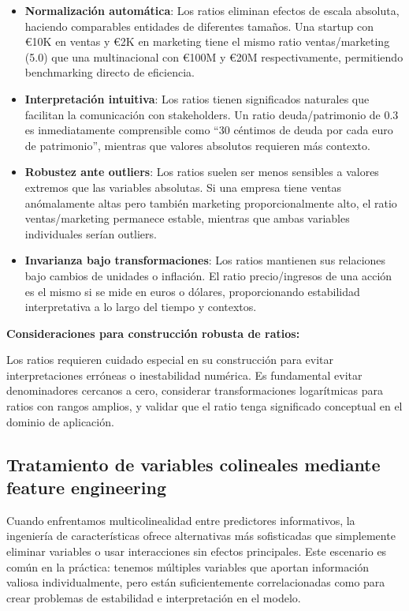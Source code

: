 \documentclass[
  letterpaper,
  DIV=11,
  numbers=noendperiod]{scrreprt}
\begin{document}
\begin{itemize}
\item
  \textbf{Normalización automática}: Los ratios eliminan efectos de
  escala absoluta, haciendo comparables entidades de diferentes tamaños.
  Una startup con €10K en ventas y €2K en marketing tiene el mismo ratio
  ventas/marketing (5.0) que una multinacional con €100M y €20M
  respectivamente, permitiendo benchmarking directo de eficiencia.
\item
  \textbf{Interpretación intuitiva}: Los ratios tienen significados
  naturales que facilitan la comunicación con stakeholders. Un ratio
  deuda/patrimonio de 0.3 es inmediatamente comprensible como ``30
  céntimos de deuda por cada euro de patrimonio'', mientras que valores
  absolutos requieren más contexto.
\item
  \textbf{Robustez ante outliers}: Los ratios suelen ser menos sensibles
  a valores extremos que las variables absolutas. Si una empresa tiene
  ventas anómalamente altas pero también marketing proporcionalmente
  alto, el ratio ventas/marketing permanece estable, mientras que ambas
  variables individuales serían outliers.
\item
  \textbf{Invarianza bajo transformaciones}: Los ratios mantienen sus
  relaciones bajo cambios de unidades o inflación. El ratio
  precio/ingresos de una acción es el mismo si se mide en euros o
  dólares, proporcionando estabilidad interpretativa a lo largo del
  tiempo y contextos.
\end{itemize}

\textbf{Consideraciones para construcción robusta de ratios:}

Los ratios requieren cuidado especial en su construcción para evitar
interpretaciones erróneas o inestabilidad numérica. Es fundamental
evitar denominadores cercanos a cero, considerar transformaciones
logarítmicas para ratios con rangos amplios, y validar que el ratio
tenga significado conceptual en el dominio de aplicación.

\subsection{Tratamiento de variables colineales mediante feature
engineering}\label{tratamiento-de-variables-colineales-mediante-feature-engineering}

Cuando enfrentamos multicolinealidad entre predictores informativos, la
ingeniería de características ofrece alternativas más sofisticadas que
simplemente eliminar variables o usar interacciones sin efectos
principales. Este escenario es común en la práctica: tenemos múltiples
variables que aportan información valiosa individualmente, pero están
suficientemente correlacionadas como para crear problemas de estabilidad
e interpretación en el modelo.
\end{document}

